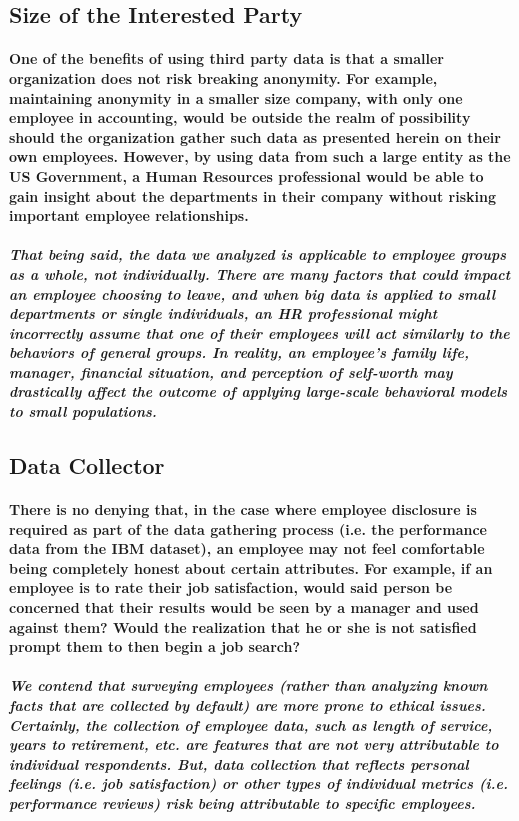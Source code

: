 \documentclass{article}
\begin{document}
\subsection{Size of the Interested Party}

\paragraph{One of the benefits of using third party data is that a smaller organization does not risk breaking anonymity. For example, maintaining anonymity in a smaller size company, with only one employee in accounting, would be outside the realm of possibility should the organization gather such data as presented herein on their own employees. However, by using data from such a large entity as the US Government, a Human Resources professional would be able to gain insight about the departments in their company without risking important employee relationships.}
 
\subparagraph{That being said, the data we analyzed is applicable to employee groups as a whole, not individually. There are many factors that could impact an employee choosing to leave, and when big data is applied to small departments or single individuals, an HR professional might incorrectly assume that one of their employees will act similarly to the behaviors of general groups. In reality, an employee’s family life, manager, financial situation, and perception of self-worth may drastically affect the outcome of applying large-scale behavioral models to small populations.}
 
\subsection{Data Collector}

\paragraph{There is no denying that, in the case where employee disclosure is required as part of the data gathering process (i.e. the performance data from the IBM dataset), an employee may not feel comfortable being completely honest about certain attributes. For example, if an employee is to rate their job satisfaction, would said person be concerned that their results would be seen by a manager and used against them? Would the realization that he or she is not satisfied prompt them to then begin a job search?}
 
\subparagraph{We contend that surveying employees (rather than analyzing known facts that are collected by default) are more prone to ethical issues. Certainly, the collection of employee data, such as length of service, years to retirement, etc. are features that are not very attributable to individual respondents. But, data collection that reflects personal feelings (i.e. job satisfaction) or other types of individual metrics (i.e. performance reviews) risk being attributable to specific employees.}
 
\end{document}
